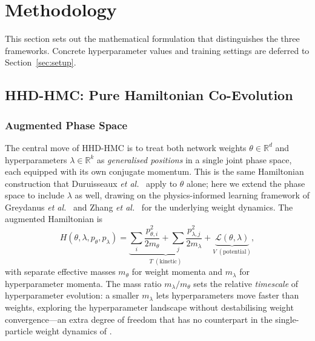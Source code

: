 \documentclass[11pt]{article}
\theoremstyle{definition}
\begin{document}

\section{Methodology}

This section sets out the mathematical formulation that
distinguishes the three frameworks. Concrete hyperparameter values
and training settings are deferred to Section~\ref{sec:setup}.

\subsection{HHD-HMC: Pure Hamiltonian Co-Evolution}

\subsubsection{Augmented Phase Space}

The central move of HHD-HMC is to treat both network weights
$\theta\in\mathbb{R}^d$ and hyperparameters $\lambda\in\mathbb{R}^k$
as \emph{generalised positions} in a single joint phase space, each
equipped with its own conjugate momentum. This is the same Hamiltonian
construction that Duruisseaux \emph{et al.}~\cite{duruisseaux2021adaptive}
apply to $\theta$ alone; here we extend the phase space to include
$\lambda$ as well, drawing on the physics-informed learning framework
of Greydanus \emph{et al.}~\cite{greydanus2019} and Zhang \emph{et
al.}~\cite{zhang2025} for the underlying weight dynamics. The
augmented Hamiltonian is
\begin{equation}
H(\theta,\lambda,p_\theta,p_\lambda)
  = \underbrace{\sum_i\frac{p_{\theta,i}^2}{2m_\theta}
    + \sum_j\frac{p_{\lambda,j}^2}{2m_\lambda}}_{T\;(\text{kinetic})}
  + \underbrace{\mathcal{L}(\theta,\lambda)}_{V\;(\text{potential})},
\label{eq:augH}
\end{equation}
with separate effective masses $m_\theta$ for weight momenta and
$m_\lambda$ for hyperparameter momenta. The mass ratio
$m_\lambda/m_\theta$ sets the relative \emph{timescale} of
hyperparameter evolution: a smaller $m_\lambda$ lets hyperparameters
move faster than weights, exploring the hyperparameter landscape
without destabilising weight convergence---an extra degree of freedom
that has no counterpart in the single-particle weight dynamics of
\cite{duruisseaux2021adaptive}.
\end{document}
